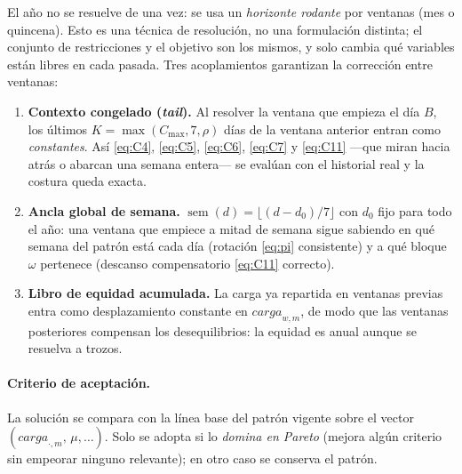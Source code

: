 \documentclass[11pt,a4paper]{article}
\newcommand{\sem}{\operatorname{sem}}
\newcommand{\load}{\mathit{carga}}
\newcommand{\Cmax}{C_{\max}}
\theoremstyle{definition}
\begin{document}
El año no se resuelve de una vez: se usa un \emph{horizonte rodante} por ventanas (mes o
quincena). Esto es una técnica de resolución, no una formulación distinta; el conjunto de
restricciones y el objetivo son los mismos, y solo cambia qué variables están libres en cada
pasada. Tres acoplamientos garantizan la corrección entre ventanas:
\begin{enumerate}[leftmargin=2.2em]
  \item \textbf{Contexto congelado (\emph{tail}).} Al resolver la ventana que empieza el día
    $B$, los últimos $K=\max(\Cmax,7,\rho)$ días de la ventana anterior entran como
    \emph{constantes}. Así \eqref{eq:C4}, \eqref{eq:C5}, \eqref{eq:C6}, \eqref{eq:C7} y
    \eqref{eq:C11} —que miran hacia atrás o abarcan una semana entera— se evalúan con el
    historial real y la costura queda exacta.
  \item \textbf{Ancla global de semana.} $\sem(d)=\lfloor(d-d_{0})/7\rfloor$ con $d_{0}$ fijo
    para todo el año: una ventana que empiece a mitad de semana sigue sabiendo en qué semana
    del patrón está cada día (rotación \eqref{eq:pi} consistente) y a qué bloque $\omega$
    pertenece (descanso compensatorio \eqref{eq:C11} correcto).
  \item \textbf{Libro de equidad acumulada.} La carga ya repartida en ventanas previas entra
    como desplazamiento constante en $\load_{w,m}$, de modo que las ventanas posteriores
    compensan los desequilibrios: la equidad es anual aunque se resuelva a trozos.
\end{enumerate}

\paragraph{Criterio de aceptación.} La solución se compara con la línea base del patrón
vigente sobre el vector $(\load_{\cdot,m},\,\mu,\dots)$. Solo se adopta si lo \emph{domina en
Pareto} (mejora algún criterio sin empeorar ninguno relevante); en otro caso se conserva el
patrón.
\end{document}
